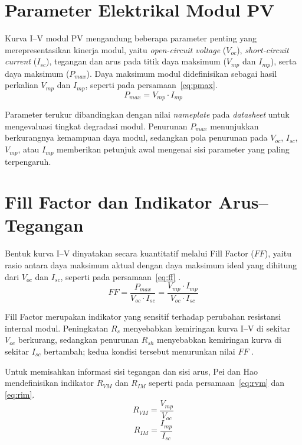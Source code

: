 \section{Parameter Elektrikal Modul PV}

Kurva I--V modul PV mengandung beberapa parameter penting yang
merepresentasikan kinerja modul, yaitu \textit{open-circuit voltage}
($V_{oc}$), \textit{short-circuit current} ($I_{sc}$), tegangan dan arus pada
titik daya maksimum ($V_{mp}$ dan $I_{mp}$), serta daya maksimum ($P_{max}$).
Daya maksimum modul didefinisikan sebagai hasil perkalian $V_{mp}$ dan
$I_{mp}$, seperti pada persamaan~\eqref{eq:pmax}.
\begin{equation}
P_{max} = V_{mp} \cdot I_{mp}
\label{eq:pmax}
\end{equation}

Parameter terukur dibandingkan dengan nilai \textit{nameplate} pada
\textit{datasheet} untuk mengevaluasi tingkat degradasi modul. Penurunan
$P_{max}$ menunjukkan berkurangnya kemampuan daya modul, sedangkan pola
penurunan pada $V_{oc}$, $I_{sc}$, $V_{mp}$, atau $I_{mp}$ memberikan petunjuk
awal mengenai sisi parameter yang paling terpengaruh.

\section{Fill Factor dan Indikator Arus--Tegangan}

Bentuk kurva I--V dinyatakan secara kuantitatif melalui Fill Factor ($FF$),
yaitu rasio antara daya maksimum aktual dengan daya maksimum ideal yang
dihitung dari $V_{oc}$ dan $I_{sc}$, seperti pada
persamaan~\eqref{eq:ff} \cite{linwu2025}.
\begin{equation}
FF = \frac{P_{max}}{V_{oc} \cdot I_{sc}}
   = \frac{V_{mp} \cdot I_{mp}}{V_{oc} \cdot I_{sc}}
\label{eq:ff}
\end{equation}

Fill Factor merupakan indikator yang sensitif terhadap perubahan resistansi
internal modul. Peningkatan $R_s$ menyebabkan kemiringan kurva I--V di sekitar
$V_{oc}$ berkurang, sedangkan penurunan $R_{sh}$ menyebabkan kemiringan kurva
di sekitar $I_{sc}$ bertambah; kedua kondisi tersebut menurunkan nilai $FF$
\cite{linwu2025,villalva2009}.

Untuk memisahkan informasi sisi tegangan dan sisi arus, Pei dan Hao
\cite{pei2019} mendefinisikan indikator $R_{VM}$ dan $R_{IM}$ seperti pada
persamaan~\eqref{eq:rvm} dan \eqref{eq:rim}.
\begin{equation}
R_{VM} = \frac{V_{mp}}{V_{oc}}
\label{eq:rvm}
\end{equation}
\begin{equation}
R_{IM} = \frac{I_{mp}}{I_{sc}}
\label{eq:rim}
\end{equation}

